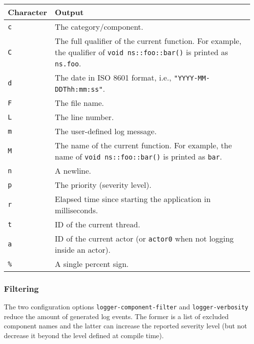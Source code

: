\begin{tabular}{ll}
  \hline
  \textbf{Character} & \textbf{Output} \\
  \hline
  \texttt{c} & The category/component. \\
  \hline
  \texttt{C} & The full qualifier of the current function. For example, the qualifier of \lstinline^void ns::foo::bar()^ is printed as \lstinline^ns.foo^. \\
  \hline
  \texttt{d} & The date in ISO 8601 format, i.e., \lstinline^"YYYY-MM-DDThh:mm:ss"^. \\
  \hline
  \texttt{F} & The file name. \\
  \hline
  \texttt{L} & The line number. \\
  \hline
  \texttt{m} & The user-defined log message. \\
  \hline
  \texttt{M} & The name of the current function. For example, the name of \lstinline^void ns::foo::bar()^ is printed as \lstinline^bar^. \\
  \hline
  \texttt{n} & A newline. \\
  \hline
  \texttt{p} & The priority (severity level). \\
  \hline
  \texttt{r} & Elapsed time since starting the application in milliseconds. \\
  \hline
  \texttt{t} & ID of the current thread. \\
  \hline
  \texttt{a} & ID of the current actor (or \lstinline^actor0^ when not logging inside an actor). \\
  \hline
  \texttt{\%} & A single percent sign. \\
  \hline
\end{tabular}

\subsubsection{Filtering}
\label{log-output-filtering}

The two configuration options \lstinline^logger-component-filter^ and
\lstinline^logger-verbosity^ reduce the amount of generated log events. The
former is a list of excluded component names and the latter can increase the
reported severity level (but not decrease it beyond the level defined at
compile time).

